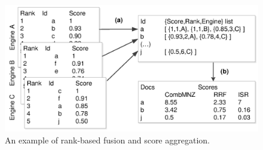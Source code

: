 \begin{figure}
\centering
\includegraphics[height=0.7\paperheight]{learning-to-rank}
\vspace*{-0.35cm}
\caption
  {An example of rank-based fusion and score aggregation.
   \cite[Figure 3]{mourao2014inverse}}
\end{figure}